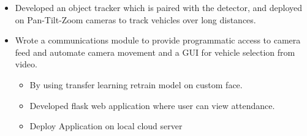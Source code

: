 \documentclass[10pt,a4paper,ragged2e]{altacv}
\begin{document}
\divider

\begin{itemize}
\item Developed an object tracker which is paired with the detector, and
deployed on Pan-Tilt-Zoom cameras to track vehicles over long
distances.
\item Wrote a communications module to provide programmatic access
to camera feed and automate camera movement and a GUI for
vehicle selection from video.


\divider









{}
\begin{itemize}
\item By using transfer learning retrain model on custom face.  
\item Developed flask web application where user can view attendance.
\item Deploy Application on local cloud server
\end{itemize}


\end{itemize}
\end{document}
